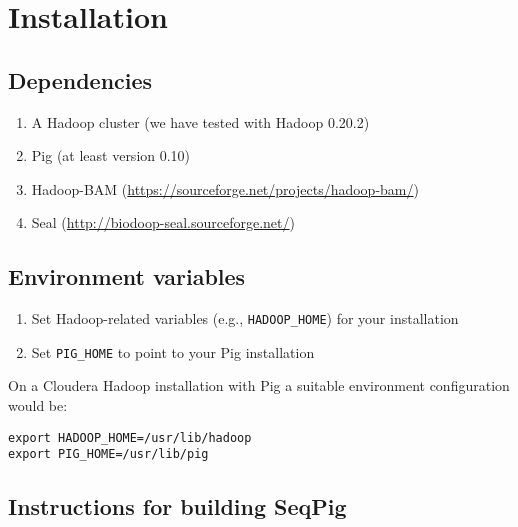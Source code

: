
\section{Installation}



\subsection{Dependencies}

\begin{enumerate}
	\item A Hadoop cluster (we have tested with Hadoop 0.20.2)
	\item Pig (at least version 0.10)
	\item Hadoop-BAM (\url{https://sourceforge.net/projects/hadoop-bam/})
	\item Seal (\url{http://biodoop-seal.sourceforge.net/})
\end{enumerate}

\subsection{Environment variables}
\label{sect:install_env}
\begin{enumerate}
\item Set Hadoop-related variables (e.g., {\tt HADOOP\_HOME}) for your
	installation
\item Set {\tt PIG\_HOME} to point to your Pig installation
\end{enumerate}

On a Cloudera Hadoop installation with Pig a suitable environment configuration would be:
\begin{lstlisting} 
export HADOOP_HOME=/usr/lib/hadoop
export PIG_HOME=/usr/lib/pig
\end{lstlisting}

\subsection{Instructions for building SeqPig}

